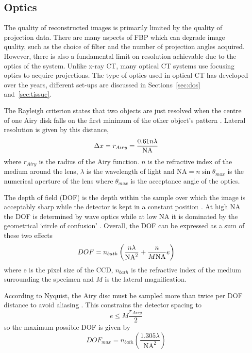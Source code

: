 	
	
	
	
	
	\subsection{Optics}
	
	The quality of reconstructed images is primarily limited by the quality of projection data. There are many aspects of FBP which can degrade image quality, such as the choice of filter and the number of projection angles acquired. However, there is also a fundamental limit on resolution achievable due to the optics of the system. Unlike x-ray CT, many optical CT systems use focusing optics to acquire projections. The type of optics used in optical CT has developed over the years, different set-ups are discussed in Sections~\ref{sec:dos} and~\ref{sec:tissue}. 
	
	The Rayleigh criterion states that two objects are just resolved when the centre of one Airy disk falls on the first minimum of the other object's pattern \cite{hecht2002optics}.
	Lateral resolution is given by this distance,
	\begin{equation}
	\Delta x=r_{Airy} = \dfrac{0.61n\lambda}{\rm{NA}}
	\label{eq:res}
	\end{equation}
	where $r_{Airy}$ is the radius of the Airy function. $n$ is the refractive index of the medium around the lens, $\lambda$ is the wavelength of light and NA$=n\sin \theta_{max}$ is the numerical aperture of the lens where $\theta_{max}$ is the acceptance angle of the optics.
	
	The depth of field (DOF) is the depth within the sample over which the image is acceptably sharp while the detector is kept in a constant position . At high NA the DOF is determined by wave optics while at low NA it is dominated by the geometrical `circle of confusion' \cite{shinya1997video}. Overall, the DOF can be expressed as a sum of these two effects
	\begin{equation}
	DOF = n_{bath}\left(\dfrac{n\lambda}{\rm{NA}^{2}} + \dfrac{n}{M\rm{NA}}e\right)
	\end{equation}
	where e is the pixel size of the CCD, $n_{bath}$ is the refractive index of the medium surrounding the specimen and $M$ is the lateral magnification.
	
	According to Nyquist, the Airy disc must be sampled more than twice per DOF distance to avoid aliasing \cite{Walls:2007jl}. This constrains the detector spacing to
	\begin{equation}
	e \leq M \dfrac{r_{Airy}}{2}
	\end{equation}
	so the maximum possible DOF is given by
	\begin{equation}
	DOF_{max} = n_{bath}\left(\dfrac{1.305\lambda}{\mathrm{NA}^{2}}\right)
	\label{eq:DOFmax}
	\end{equation}
	
